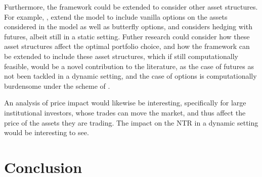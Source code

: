 \documentclass[11pt]{article}
\begin{document}
Furthermore, the framework could be extended to consider other asset structures.
For example, \autocite{CaiJuddXu2020}, extend the model to include vanilla options on the assets considered in the model as well as butterfly options,
and \autocite{Dybvig2020} considers hedging with futures, albeit still in a static setting.
Futher research could consider how these asset structures affect the optimal portfolio choice, and how the framework can be extended to include these asset structures,
which if still computationally feasible, would be a novel contribution to the literature, as the case of futures as not been tackled in a dynamic setting,
and the case of options is computationally burdensome under the scheme of \autocite{CaiJuddXu2020}.

An analysis of price impact would likewise be interesting, specifically for large institutional investors,
whose trades can move the market, and thus affect the price of the assets they are trading. The impact on the \ac{NTR} in a dynamic setting would be interesting to see.

\section{Conclusion} \label{Section: Conclusion}


\ifdefined\COMPILINGMAIN
\else
\end{document}
